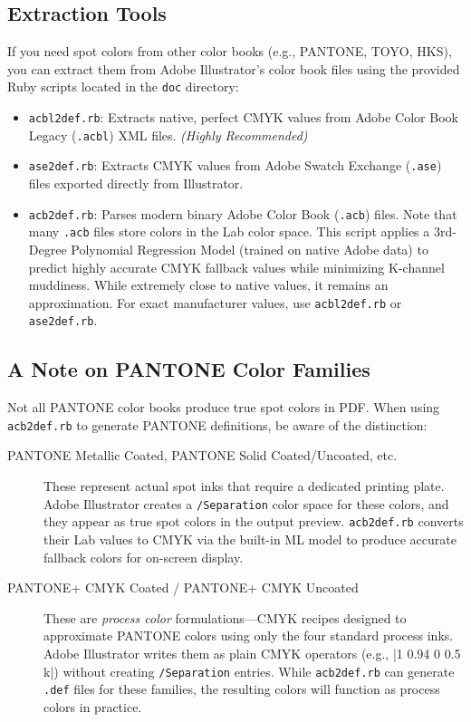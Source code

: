 \documentclass[luatex]{article}\listfiles
\begin{document}
\subsection{Extraction Tools}
If you need spot colors from other color books (e.g., PANTONE, TOYO, HKS), you can extract them from Adobe Illustrator's color book files using the provided Ruby scripts located in the \texttt{doc} directory:

\begin{itemize}
\item \texttt{acbl2def.rb}: Extracts native, perfect CMYK values from Adobe Color Book Legacy (\texttt{.acbl}) XML files. \emph{(Highly Recommended)}
\item \texttt{ase2def.rb}: Extracts CMYK values from Adobe Swatch Exchange (\texttt{.ase}) files exported directly from Illustrator.
\item \texttt{acb2def.rb}: Parses modern binary Adobe Color Book (\texttt{.acb}) files. Note that many \texttt{.acb} files store colors in the Lab color space. This script applies a 3rd-Degree Polynomial Regression Model (trained on native Adobe data) to predict highly accurate CMYK fallback values while minimizing K-channel muddiness. While extremely close to native values, it remains an approximation. For exact manufacturer values, use \texttt{acbl2def.rb} or \texttt{ase2def.rb}.
\end{itemize}

\subsection{A Note on PANTONE Color Families}

Not all PANTONE color books produce true spot colors in PDF.
When using \texttt{acb2def.rb} to generate PANTONE definitions, be aware of the distinction:

\begin{description}
\item[PANTONE Metallic Coated, PANTONE Solid Coated/Uncoated, etc.]
These represent actual spot inks that require a dedicated printing plate.
Adobe Illustrator creates a \texttt{/Separation} color space for these colors, and they appear as true spot colors in the output preview.
\texttt{acb2def.rb} converts their Lab values to CMYK via the built-in ML model to produce accurate fallback colors for on-screen display.

\item[PANTONE+ CMYK Coated / PANTONE+ CMYK Uncoated]
These are \emph{process color} formulations---CMYK recipes designed to approximate PANTONE colors using only the four standard process inks.
Adobe Illustrator writes them as plain CMYK operators (e.g., |1 0.94 0 0.5 k|) without creating \texttt{/Separation} entries.
While \texttt{acb2def.rb} can generate \texttt{.def} files for these families, the resulting colors will function as process colors in practice.
\end{description}
\end{document}
